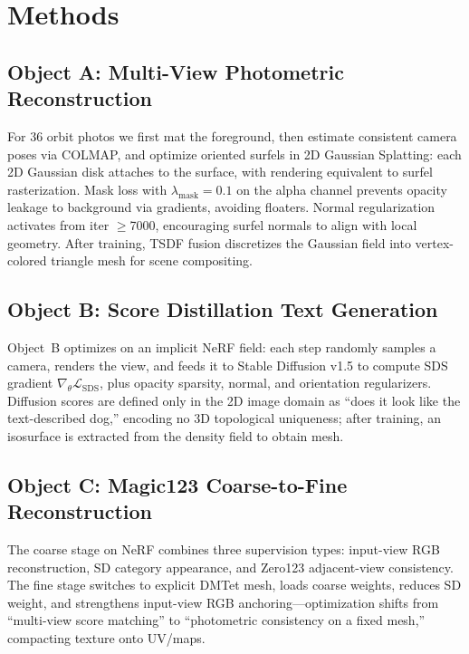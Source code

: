 \documentclass[10pt,twocolumn,letterpaper]{article}
\begin{document}
\section{Methods}
\label{sec:t1-method}

\subsection{Object A: Multi-View Photometric Reconstruction}

For 36 orbit photos we first mat the foreground, then estimate consistent camera poses via COLMAP, and optimize oriented surfels in 2D Gaussian Splatting: each 2D Gaussian disk attaches to the surface, with rendering equivalent to surfel rasterization. Mask loss with $\lambda_{\mathrm{mask}}{=}0.1$ on the alpha channel prevents opacity leakage to background via gradients, avoiding floaters. Normal regularization activates from iter $\geq$7000, encouraging surfel normals to align with local geometry. After training, TSDF fusion discretizes the Gaussian field into vertex-colored triangle mesh for scene compositing.

\subsection{Object B: Score Distillation Text Generation}

Object~B optimizes on an implicit NeRF field: each step randomly samples a camera, renders the view, and feeds it to Stable Diffusion v1.5 to compute SDS gradient $\nabla_\theta \mathcal{L}_{\mathrm{SDS}}$, plus opacity sparsity, normal, and orientation regularizers. Diffusion scores are defined only in the 2D image domain as ``does it look like the text-described dog,'' encoding no 3D topological uniqueness; after training, an isosurface is extracted from the density field to obtain mesh.

\subsection{Object C: Magic123 Coarse-to-Fine Reconstruction}

The coarse stage on NeRF combines three supervision types: input-view RGB reconstruction, SD category appearance, and Zero123 adjacent-view consistency. The fine stage switches to explicit DMTet mesh, loads coarse weights, reduces SD weight, and strengthens input-view RGB anchoring---optimization shifts from ``multi-view score matching'' to ``photometric consistency on a fixed mesh,'' compacting texture onto UV/maps.
\end{document}
